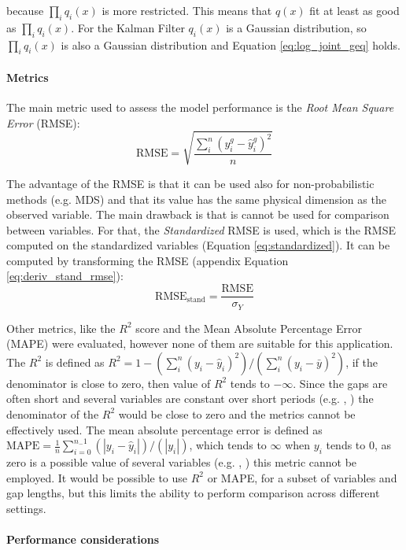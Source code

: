 \documentclass{article}
\begin{document}
because $\prod_i q_i(x)$ is more restricted. This means that $q(x)$ fit at least as good as $\prod_i q_i(x)$.
For the Kalman Filter $q_i(x)$ is a Gaussian distribution, so $\prod_i q_i(x)$ is also a Gaussian distribution and Equation \ref{eq:log_joint_geq} holds.

\paragraph{Metrics} The main metric used to assess the model performance is the \emph{Root Mean Square Error} (RMSE):
\begin{equation*}
    \text{RMSE} = \sqrt{\frac{\sum_i^n (y^g_i - \hat{y}^g_i)^2}{n}}
\end{equation*}

The advantage of the RMSE is that it can be used also for non-probabilistic methods (e.g. MDS) and that its value has the same physical dimension as the observed variable. The main drawback is that is cannot be used for comparison between variables. For that, the \emph{Standardized} RMSE is used, which is the RMSE computed on the standardized variables (Equation \ref{eq:standardized}). It can be computed by transforming the RMSE (appendix Equation \ref{eq:deriv_stand_rmse}):
\begin{equation*}
    \text{RMSE}_{\text{stand}} = \frac{\text{RMSE}}{\sigma_Y} 
\end{equation*}

Other metrics, like the $R^2$ score and the Mean Absolute Percentage Error (MAPE) were evaluated, however none of them are suitable for this application. The $R^2$ is defined as $R^2 = 1 - (\sum_{i}^{n} (y_i - \hat{y}_i)^2)/(\sum_{i}^{n} (y_i - \bar{y})^2)$, if the denominator is close to zero, then value of $R^2$ tends to $- \infty$. Since the gaps are often short and several variables are constant over short periods (e.g. , ) the denominator of the $R^2$ would be close to zero and the metrics cannot be effectively used. The mean absolute percentage error is defined as $\text{MAPE} = \frac{1}{n} \sum_{i=0}^{n_-1} (\left| y_i - \hat{y}_i \right|)/(\left| y_i \right|)$, which tends to $\infty$ when $y_i$ tends to 0, as zero is a possible value of several variables (e.g. , ) this metric cannot be employed.
It would be possible to use $R^2$ or MAPE, for a subset of variables and gap lengths, but this limits the ability to perform comparison across different settings. 

\paragraph{Performance considerations} 
\end{document}
